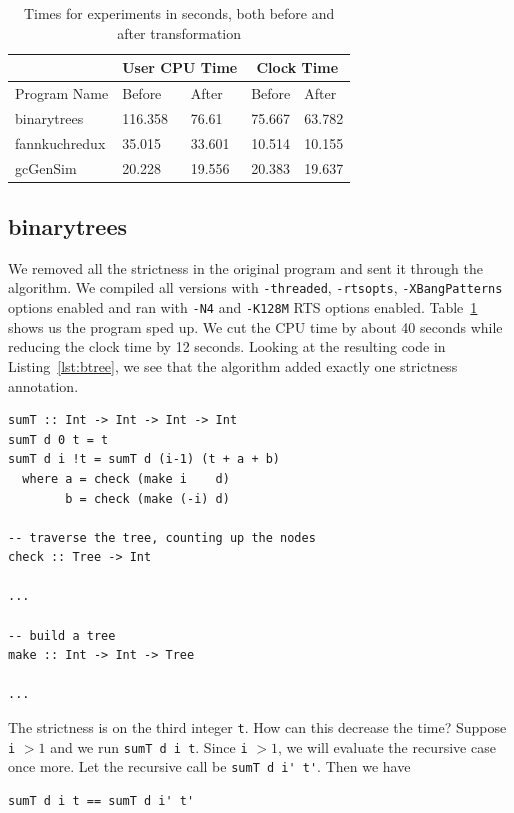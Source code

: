 \documentclass[preprint,nocopyrightspace]{sigplanconf}
\begin{document}
\begin{table}[t]
\label{tab:expr}
\begin{tabular}{| l | l | l | l | l |}
\hline
 & \multicolumn{2}{|c|}{User CPU Time} & \multicolumn{2}{|c|}{Clock Time}\\
\hline
Program Name & Before & After & Before & After\\
\hline
binarytrees & 116.358 & 76.61 & 75.667 & 63.782\\
\hline
fannkuchredux & 35.015 & 33.601 & 10.514 & 10.155\\
\hline
gcGenSim & 20.228 & 19.556 & 20.383 & 19.637\\
\hline
\end{tabular}
\caption{Times for experiments in seconds, both before and after transformation}
\end{table}
\subsection{binarytrees}
We removed all the strictness in the original program and sent it through the algorithm. We compiled all versions with \lstinline!-threaded!, \lstinline!-rtsopts!, \lstinline!-XBangPatterns! options enabled and ran with \lstinline!-N4! and \lstinline!-K128M! RTS options enabled. Table~\ref{tab:expr} shows us the program sped up. We cut the CPU time by about 40 seconds while reducing the clock time by 12 seconds. Looking at the resulting code in Listing~\ref{lst:btree}, we see that the algorithm added exactly one strictness annotation.
\begin{lstlisting}[float,frame=single,caption=Changes in \lstinline!binarytrees! after applying the genetic algorithm,label=lst:btree]
sumT :: Int -> Int -> Int -> Int
sumT d 0 t = t
sumT d i !t = sumT d (i-1) (t + a + b)
  where a = check (make i    d)
        b = check (make (-i) d)

-- traverse the tree, counting up the nodes
check :: Tree -> Int

...

-- build a tree
make :: Int -> Int -> Tree

...
\end{lstlisting}
The strictness is on the third integer \lstinline!t!. How can this decrease the time? Suppose \lstinline!i! $ > 1$ and we run \lstinline!sumT d i t!. Since \lstinline!i! $ > 1$, we will evaluate the recursive case once more. Let the recursive call be \lstinline!sumT d i' t'!. Then we have 
\begin{lstlisting}
sumT d i t == sumT d i' t'
\end{lstlisting}
\end{document}
